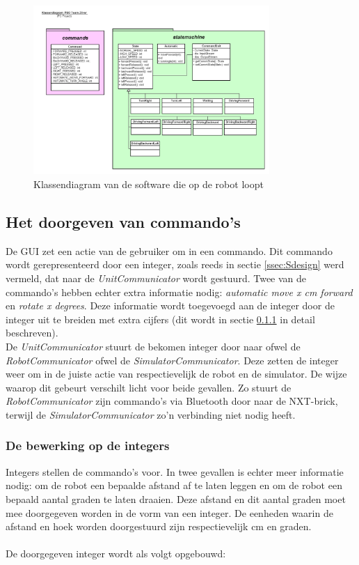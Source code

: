 \documentclass[tt1]{penoverslag}
\begin{document}
\begin{figure}[tbp]
\begin{center}
    \includegraphics[width=0.8\textwidth]{KlassendiagramNXT}
    \caption{Klassendiagram van de software die op de robot loopt}
	\label{fig:klasDiaNXT}
\end{center}
\end{figure}

\subsection{Het doorgeven van commando's}
\label{ssec:commands}
De GUI zet een actie van de gebruiker om in een commando. Dit commando wordt gerepresenteerd door een integer, zoals reeds in sectie \ref{ssec:Sdesign} werd vermeld, dat naar de \textit{UnitCommunicator} wordt gestuurd. Twee van de commando's hebben echter extra informatie nodig: \textit{automatic move x cm forward} en \textit{rotate x degrees}. Deze informatie wordt toegevoegd aan de integer door de integer uit te breiden met extra cijfers (dit wordt in sectie \ref{sssec:integer} in detail beschreven).\\
De \textit{UnitCommunicator} stuurt de bekomen integer door naar ofwel de \textit{RobotCommunicator} ofwel de \textit{SimulatorCommunicator}. Deze zetten de integer weer om in de juiste actie van respectievelijk de robot en de simulator. De wijze waarop dit gebeurt verschilt licht voor beide gevallen. Zo stuurt de \textit{RobotCommunicator} zijn commando's via Bluetooth door naar de NXT-brick, terwijl de \textit{SimulatorCommunicator} zo'n verbinding niet nodig heeft.\\

\subsubsection{De bewerking op de integers}
\label{sssec:integer}
Integers stellen de commando's voor. In twee gevallen is echter meer informatie nodig: om de robot een bepaalde afstand af te laten leggen en om de robot een bepaald aantal graden te laten draaien. Deze afstand en dit aantal graden moet mee doorgegeven worden in de vorm van een integer. De eenheden waarin de afstand en hoek worden doorgestuurd zijn respectievelijk cm en graden.\\\\
De doorgegeven integer wordt als volgt opgebouwd:
\end{document}
